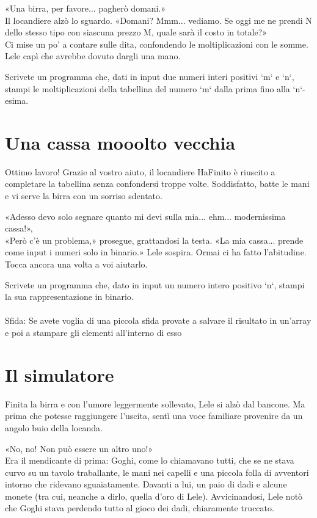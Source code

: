 \documentclass[a4paper]{article}
\begin{document}
«Una birra, per favore... pagherò domani.»\\
Il locandiere alzò lo sguardo. «Domani? Mmm... vediamo. Se oggi me ne prendi N dello stesso tipo con siascuna prezzo M, quale sarà il costo in totale?»\\
Ci mise un po’ a contare sulle dita, confondendo le moltiplicazioni con le somme.
Lele capì che avrebbe dovuto dargli una mano.

Scrivete un programma che, dati in input due numeri interi positivi `m` e `n`, stampi le moltiplicazioni della tabellina del numero `m` dalla prima fino alla `n`-esima.

\section*{Una cassa mooolto vecchia}
Ottimo lavoro! Grazie al vostro aiuto, il locandiere HaFinito è riuscito a completare la tabellina senza confondersi troppe volte. Soddisfatto, batte le mani e vi serve la birra con un sorriso sdentato.

«Adesso devo solo segnare quanto mi devi sulla mia... ehm... modernissima cassa!»,\\
«Però c'è un problema,» prosegue, grattandosi la testa. «La mia cassa... prende come input i numeri solo in binario.»
Lele sospira. Ormai ci ha fatto l’abitudine. Tocca ancora una volta a voi aiutarlo.

Scrivete un programma che, dato in input un numero intero positivo `n`, stampi la sua rappresentazione in binario.\\
\\
Sfida: Se avete voglia di una piccola sfida provate a salvare il risultato in un'array e poi a stampare gli elementi all'interno di esso

\section*{Il simulatore}
Finita la birra e con l’umore leggermente sollevato, Lele si alzò dal bancone. Ma prima che potesse raggiungere l’uscita, sentì una voce familiare provenire da un angolo buio della locanda.

«No, no! Non può essere un altro uno!»\\
Era il mendicante di prima: Goghi, come lo chiamavano tutti, che se ne stava curvo su un tavolo traballante, le mani nei capelli e una piccola folla di avventori intorno che ridevano sguaiatamente. Davanti a lui, un paio di dadi e alcune monete (tra cui, neanche a dirlo, quella d’oro di Lele).
Avvicinandosi, Lele notò che Goghi stava perdendo tutto al gioco dei dadi, chiaramente truccato.
\end{document}
